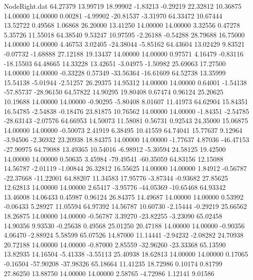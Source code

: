 \begin{filecontents}{NodeRight.dat}
  64.27379   13.99719   18.99902    -1.83213   -0.29219   22.32812   10.36875   14.00000   14.00000    0.00281   -4.99902  -20.81537   -3.31970
  64.33472   10.67444   13.52722     0.49568    1.06868   26.20000   13.41250   14.00000   14.00000    3.32556    0.47278    5.35726   11.55018
  64.38540    9.53247   10.97595    -2.26188   -0.54288   28.79688   16.75000   14.00000   14.00000    4.46753    3.02405  -24.38044   -5.85162
  64.43604   13.02429    9.83521    -0.07732   -1.68888   27.12188   19.13437   14.00000   14.00000    0.97571    4.16479   -0.83116  -18.15503
  64.48665   14.33228   13.42651    -3.04975   -1.50982   25.69063   17.27500   14.00000   14.00000   -0.33228    0.57349  -33.56364  -16.61609
  64.52738   13.35999   15.54138    -5.01944   -2.51257   26.29375   14.95312   14.00000   14.00000    0.64001   -1.54138  -57.85737  -28.96150
  64.57822   14.90295   19.80408     0.67474    0.96124   25.20625   10.19688   14.00000   14.00000   -0.90295   -5.80408    8.01607   11.41973
  64.62904   15.84351   16.54785    -2.54838   -0.18476   23.81875   10.76562   14.00000   14.00000   -1.84351   -2.54785  -28.63143   -2.07576
  64.66953   14.50073   11.58081     0.56731    0.92543   24.35000   15.06875   14.00000   14.00000   -0.50073    2.41919    6.38495   10.41559
  64.74041   15.77637    9.12964    -3.94506   -2.36932   23.20938   18.84375   14.00000   14.00000   -1.77637    4.87036  -46.47153  -27.90975
  64.79088   13.49365   10.54016    -6.98912   -5.30594   24.58125   19.42500   14.00000   14.00000    0.50635    3.45984  -79.49541  -60.35059
  64.83156   12.15088   14.56787    -2.01119   -1.00844   26.32812   16.55625   14.00000   14.00000    1.84912   -0.56787  -22.37668  -11.22001
  64.88207   11.34583   17.95776    -3.87344   -0.93682   27.85625   12.62813   14.00000   14.00000    2.65417   -3.95776  -44.05369  -10.65468
  64.93342   13.46008   14.06433     0.45987    0.96124   26.84375   14.49687   14.00000   14.00000    0.53992   -0.06433    5.28927   11.05594
  64.97392   14.56787   10.60730    -2.15444   -0.29219   25.66562   18.26875   14.00000   14.00000   -0.56787    3.39270  -23.82255   -3.23090
  65.02458   14.90356    9.93530    -0.25638    0.49568   25.01250   20.47188   14.00000   14.00000   -0.90356    4.06470   -2.88924    5.58599
  65.07526   14.87000   11.14441    -2.94232   -2.08282   24.70938   20.72188   14.00000   14.00000   -0.87000    2.85559  -32.96260  -23.33368
  65.13590   13.82935   14.16504    -5.41338   -3.55113   25.40938   18.62813   14.00000   14.00000    0.17065   -0.16504  -57.90208  -37.98326
  65.18664   11.41235   18.72986     0.10174    0.81799   27.86250   13.88750   14.00000   14.00000    2.58765   -4.72986    1.12141    9.01586

\end{filecontents}
